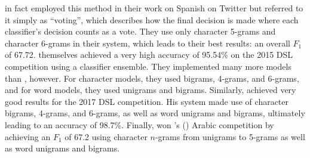 \documentclass{article}
\begin{document}
      \textcite{maier_language_2014} in fact employed this method in their work on Spanish on Twitter but referred to it simply as ``voting'', which describes how the final decision is made where each classifier's decision counts as a vote.
      They use only character 5-grams and character 6-grams in their system, which leads to their best results: an overall $F_1$ of 67.72.
      \textcite{malmasi_language_2015} themselves achieved a very high accuracy of 95.54\% on the 2015 DSL competition using a classifier ensemble.
      They implemented many more models than \textcite{maier_language_2014}, however.
      For character models, they used bigrams, 4-grams, and 6-grams, and for word models, they used unigrams and bigrams.
      Similarly, \textcite{duvenhage_short_2019} achieved very good results for the 2017 DSL competition.
      His system made use of character bigrams, 4-grams, and 6-grams, as well as word unigrams and bigrams, ultimately leading to an accuracy of 98.7\%.
      Finally, \textcite{ragab_mawdoo3_2019} won \citeauthor{bouamor_madar_2019}'s (\citeyear{bouamor_madar_2019}) Arabic competition by achieving an $F_1$ of 67.2 using character $n$-grams from unigrams to 5-grams as well as word unigrams and bigrams.

\end{document}
